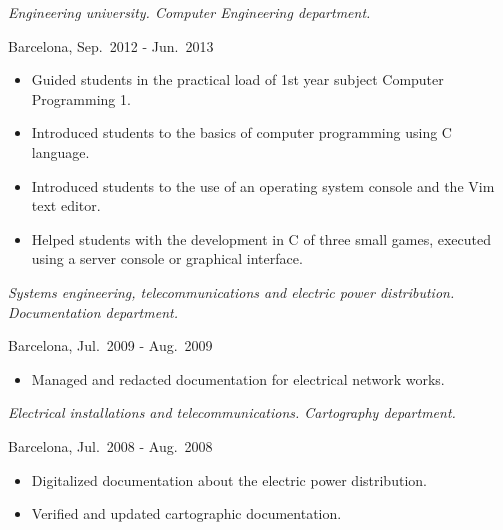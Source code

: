 \begin{description}[itemsep=15pt]
        \emph{Engineering university. Computer Engineering department.}

        Barcelona, Sep.\ 2012 - Jun.\ 2013
        \begin{itemize}
            \item Guided students in the practical load of 1st year subject Computer Programming 1.
            \item Introduced students to the basics of computer programming using C language.
            \item Introduced students to the use of an operating system console and the Vim text editor.
            \item Helped students with the development in C of three small games, executed using a server console or graphical interface.
        \end{itemize}

    \item[\href{http://www.itc2.com}{ITC-2}, Technical Assistant] \hfill

        \emph{Systems engineering, telecommunications and electric power distribution. Documentation department.}

        Barcelona, Jul.\ 2009 - Aug.\ 2009
        \begin{itemize}
            \item Managed and redacted documentation for electrical network works.
        \end{itemize}

    \item[\href{http://sparkiberica.com}{Spark Ibérica}, Technical Assistant] \hfill

        \emph{Electrical installations and telecommunications. Cartography department.}

        Barcelona, Jul.\ 2008 - Aug.\ 2008
        \begin{itemize}
            \item Digitalized documentation about the electric power distribution.
            \item Verified and updated cartographic documentation.
        \end{itemize}

\end{description}